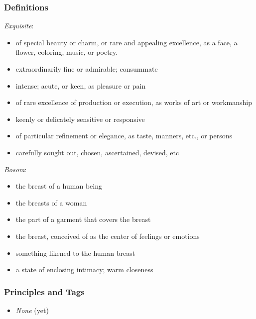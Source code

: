 \documentclass[12pt]{report}
\begin{document}
\subsubsection{Definitions\label{js:DFN4}}
\emph{Exquisite}: \begin{itemize}
\item of special beauty or charm, or rare and appealing excellence, as a face, a flower, coloring, music, or poetry.
\item extraordinarily fine or admirable; consummate
\item intense; acute, or keen, as pleasure or pain
\item of rare excellence of production or execution, as works of art or workmanship
\item keenly or delicately sensitive or responsive
\item of particular refinement or elegance, as taste, manners, etc., or persons
\item carefully sought out, chosen, ascertained, devised, etc
\end{itemize}
\emph{Bosom}: \begin{itemize}
\item the breast of a human being
\item the breasts of a woman
\item the part of a garment that covers the breast
\item the breast, conceived of as the center of feelings or emotions
\item something likened to the human breast
\item a state of enclosing intimacy; warm closeness
\end{itemize}

\subsubsection{Principles and Tags\label{js:principles4}}
\begin{itemize}
\item \index{}\emph{None} (yet)
\end{itemize}
\end{document}
